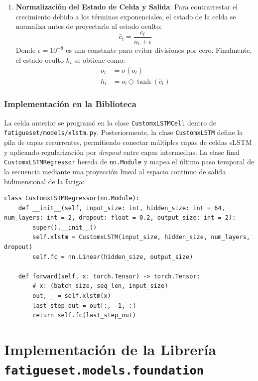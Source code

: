 \documentclass[12pt, a4paper]{article}
\newcommand{\code}[1]{\texttt{#1}}
\begin{document}
\begin{enumerate}
    \item \textbf{Normalización del Estado de Celda y Salida}:
    Para contrarrestar el crecimiento debido a los términos exponenciales, el estado de la celda se normaliza antes de proyectarlo al estado oculto:
    \begin{equation}
        \hat{c}_t = \frac{c_t}{n_t + \epsilon}
    \end{equation}
    Donde $\epsilon = 10^{-8}$ es una constante para evitar divisiones por cero. Finalmente, el estado oculto $h_t$ se obtiene como:
    \begin{align}
        o_t &= \sigma(\tilde{o}_t) \\
        h_t &= o_t \odot \tanh(\hat{c}_t)
    \end{align}
\end{enumerate}

\subsubsection{Implementación en la Biblioteca}

La celda anterior se programó en la clase \code{CustomxLSTMCell} dentro de \code{fatigueset/models/xlstm.py}. Posteriormente, la clase \code{CustomxLSTM} define la pila de capas recurrentes, permitiendo conectar múltiples capas de celdas sLSTM y aplicando regularización por \emph{dropout} entre capas intermedias. La clase final \code{CustomxLSTMRegressor} hereda de \code{nn.Module} y mapea el último paso temporal de la secuencia mediante una proyección lineal al espacio continuo de salida bidimensional de la fatiga:

\begin{lstlisting}[caption={Estructura de la clase CustomxLSTMRegressor.}, label={lst:xlstm_regressor}]
class CustomxLSTMRegressor(nn.Module):
    def __init__(self, input_size: int, hidden_size: int = 64, num_layers: int = 2, dropout: float = 0.2, output_size: int = 2):
        super().__init__()
        self.xlstm = CustomxLSTM(input_size, hidden_size, num_layers, dropout)
        self.fc = nn.Linear(hidden_size, output_size)

    def forward(self, x: torch.Tensor) -> torch.Tensor:
        # x: (batch_size, seq_len, input_size)
        out, _ = self.xlstm(x)
        last_step_out = out[:, -1, :]
        return self.fc(last_step_out)
\end{lstlisting}


\section{Implementación de la Librería \code{fatigueset.models.foundation}}
\label{sec:implementacion_foundation}
\end{document}
